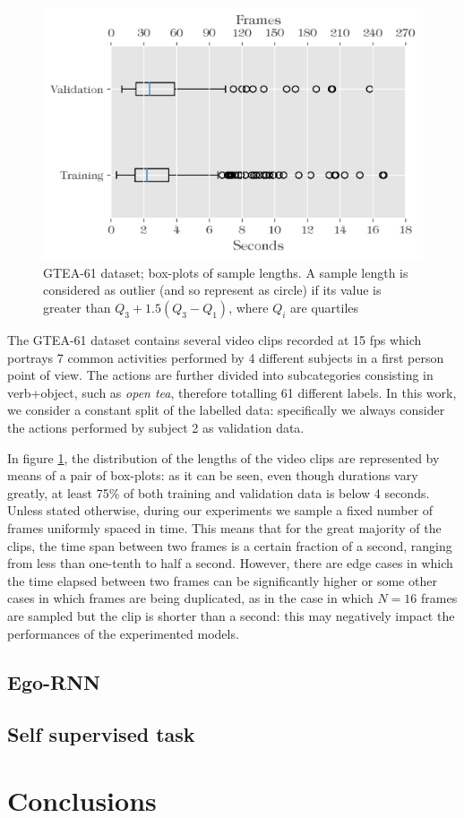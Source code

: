 \documentclass[10pt,twocolumn,letterpaper]{article}
\begin{document}
\begin{figure}
	\begin{center}
		\includegraphics[width=\linewidth]{grafici/GTEA61_boxplot.png}		
	\end{center}
	\caption{GTEA-61 dataset; box-plots of sample lengths. A sample length is considered as outlier (and so represent as circle) if its value is greater than $Q_3 + 1.5(Q_3-Q_1)$, where $Q_i$ are quartiles}
	\label{fig:GTEA61_boxplot}
\end{figure}

The GTEA-61 dataset contains several video clips recorded at 15 fps which portrays 7 common activities performed by 4 different subjects in a first person point of view. The actions are further divided into subcategories consisting in verb+object, such as \textit{open tea}, therefore totalling 61 different labels. In this work, we consider a constant split of the labelled data: specifically we always consider the actions performed by subject 2 as validation data.

In figure \ref{fig:GTEA61_boxplot}, the distribution of the lengths of the video clips are represented by means of a pair of box-plots: as it can be seen, even though durations vary greatly, at least 75\% of both training and validation data is below 4 seconds. Unless stated otherwise, during our experiments we sample a fixed number of frames uniformly spaced in time. This means that for the great majority of the clips, the time span between two frames is a certain fraction of a second, ranging from less than one-tenth to half a second. However, there are edge cases in which the time elapsed between two frames can be significantly higher or some other cases in which frames are being duplicated, as in the case in which $N = 16$ frames are sampled but the clip is shorter than a second: this may negatively impact the performances of the experimented models.

\subsection{Ego-RNN}

\subsection{Self supervised task}

\section{Conclusions}

{\small


}
\end{document}
